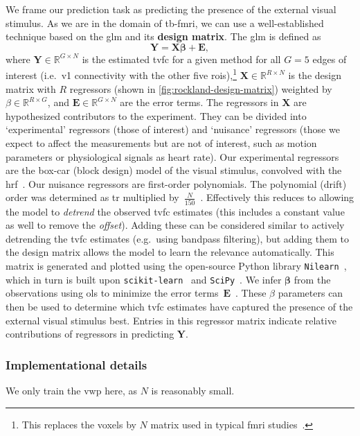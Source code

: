 We frame our prediction task as predicting the presence of the external visual stimulus.
As we are in the domain of \gls{tb-fmri}, we can use a well-established technique based on the \gls{glm} and its \textbf{design matrix}.
The \gls{glm} is defined as
\begin{equation}
  \mathbf{Y} = \mathbf{X} \mathbf{\beta} + \mathbf{E},
\end{equation}
where $\mathbf{Y} \in \mathbb{R}^{G \times N}$ is the estimated \gls{tvfc} for a given method for all $G = 5$ edges of interest (i.e.~\gls{v1} connectivity with the other five \glspl{roi}),\footnote{This replaces the voxels by $N$ matrix used in typical \gls{fmri} studies~\parencite{Friston1995}.} $\mathbf{X} \in \mathbb{R}^{R \times N}$ is the design matrix with $R$ regressors (shown in \cref{fig:rockland-design-matrix}) weighted by $\beta \in \mathbb{R}^{R \times G}$, and $\mathbf{E} \in \mathbb{R}^{G \times N}$ are the error terms.
%
The regressors in $\mathbf{X}$ are hypothesized contributors to the experiment.
They can be divided into `experimental' regressors (those of interest) and `nuisance' regressors (those we expect to affect the measurements but are not of interest, such as motion parameters or physiological signals as heart rate).
Our experimental regressors are the box-car (block design) model of the visual stimulus, convolved with the \gls{hrf}~\parencite{Glover1999}.
Our nuisance regressors are first-order polynomials.
The polynomial (drift) order was determined as \gls{tr} multiplied by~$\frac{N}{150}$~\parencite[see][for rationale]{Worsley2002}.
Effectively this reduces to allowing the model to \emph{detrend} the observed \gls{tvfc} estimates (this includes a constant value as well to remove the \emph{offset}).
Adding these can be considered similar to actively detrending the \gls{tvfc} estimates (e.g.~using bandpass filtering), but adding them to the design matrix allows the model to learn the relevance automatically.
This matrix is generated and plotted using the open-source Python library \texttt{Nilearn}~\parencite[][version~0.9.2]{Abraham2014}, which in turn is built upon \texttt{scikit-learn}~\parencite[][version~1.1.1]{Pedregosa2011} and \texttt{SciPy}~\parencite[][version~1.8.0]{SciPy2020}.
We infer $\mathbf{\beta}$ from the observations using \gls{ols} to minimize the error terms~$\mathbf{E}$~\parencite{Worsley1995}.
These $\beta$ parameters can then be used to determine which \gls{tvfc} estimates have captured the presence of the external visual stimulus best.
Entries in this regressor matrix indicate relative contributions of regressors in predicting $\mathbf{Y}$.

\subsubsection{Implementational details}

We only train the \gls{vwp} here, as $N$ is reasonably small.
